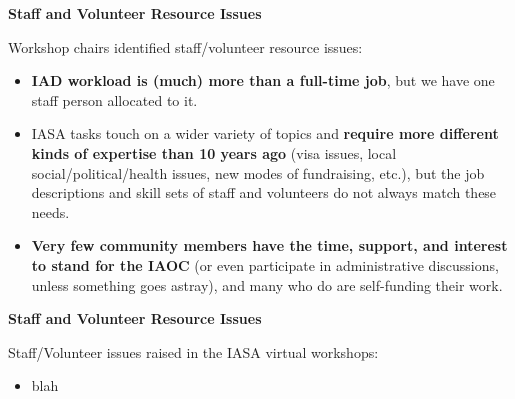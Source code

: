 \documentclass[helvetica]{seminar}
\newcommand{\heading}[1]{%
  \begin{center} 
    \large\bf 
    #1 
  \end{center} 
  \vspace{.4 in}}
\begin{document}
\begin{slide}
\heading{Staff and Volunteer Resource Issues}

Workshop chairs identified staff/volunteer resource issues:
{\footnotesize
\begin{itemize}
\item \textbf{IAD workload is (much) more than a full-time job}, but
  we have one staff person allocated to it.
\item IASA tasks touch on a wider variety of topics and
  \textbf{require more different kinds of expertise than 10 years ago}
  (visa issues, local social/political/health issues, new modes of
  fundraising, etc.), but the job descriptions and skill sets of staff
  and volunteers do not always match these needs.
\item \textbf{Very few community members have the time, support, and
  interest to stand for the IAOC} (or even participate in
  administrative discussions, unless something goes astray), and many
  who do are self-funding their work.
\end{itemize}
}

\end{slide}

\begin{slide}
\heading{Staff and Volunteer Resource Issues}

Staff/Volunteer issues raised in the IASA virtual workshops:
\begin{itemize}
\item blah
\end{itemize}

\end{slide}
\end{document}
